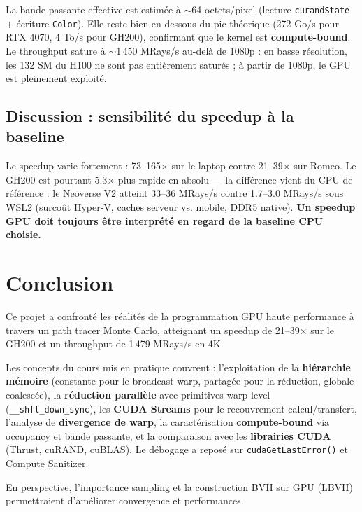 \documentclass[12pt,a4paper]{article}
\begin{document}
La bande passante effective est estimée à $\sim$64 octets/pixel (lecture \texttt{curandState} + écriture \texttt{Color}). Elle reste bien en dessous du pic théorique (272 Go/s pour RTX 4070, 4 To/s pour GH200), confirmant que le kernel est \textbf{compute-bound}. Le throughput sature à $\sim$1\,450 MRays/s au-delà de 1080p : en basse résolution, les 132 SM du H100 ne sont pas entièrement saturés ; à partir de 1080p, le GPU est pleinement exploité.

\subsection{Discussion : sensibilité du speedup à la baseline}

Le speedup varie fortement : 73--165$\times$ sur le laptop contre 21--39$\times$ sur Romeo. Le GH200 est pourtant 5.3$\times$ plus rapide en absolu --- la différence vient du CPU de référence : le Neoverse V2 atteint 33--36 MRays/s contre 1.7--3.0 MRays/s sous WSL2 (surcoût Hyper-V, caches serveur vs. mobile, DDR5 native). \textbf{Un speedup GPU doit toujours être interprété en regard de la baseline CPU choisie.}

\section{Conclusion}

Ce projet a confronté les réalités de la programmation GPU haute performance à travers un path tracer Monte Carlo, atteignant un speedup de 21--39$\times$ sur le GH200 et un throughput de 1\,479 MRays/s en 4K.

Les concepts du cours mis en pratique couvrent : l'exploitation de la \textbf{hiérarchie mémoire} (constante pour le broadcast warp, partagée pour la réduction, globale coalescée), la \textbf{réduction parallèle} avec primitives warp-level (\texttt{\_\_shfl\_down\_sync}), les \textbf{CUDA Streams} pour le recouvrement calcul/transfert, l'analyse de \textbf{divergence de warp}, la caractérisation \textbf{compute-bound} via occupancy et bande passante, et la comparaison avec les \textbf{librairies CUDA} (Thrust, cuRAND, cuBLAS). Le débogage a reposé sur \texttt{cudaGetLastError()} et Compute Sanitizer.

En perspective, l'importance sampling et la construction BVH sur GPU (LBVH) permettraient d'améliorer convergence et performances.
\end{document}
